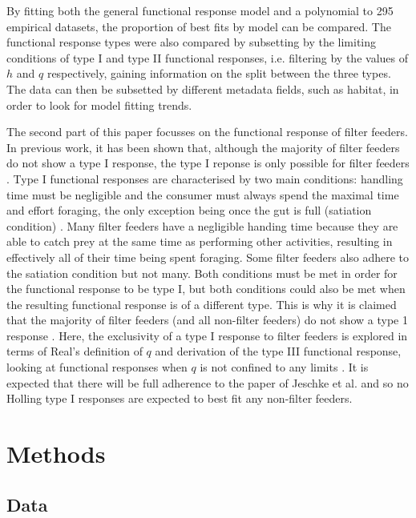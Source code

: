 \documentclass[11pt, a4paper, titlepage]{article}
\begin{document}
By fitting both the general functional response model and a polynomial to 295 empirical datasets, the proportion of best fits by model can be compared. The functional response types were also compared by subsetting by the limiting conditions of type I and type II functional responses, i.e. filtering by the values of $h$ and $q$ respectively, gaining information on the split between the three types. The data can then be subsetted by different metadata fields, such as habitat, in order to look for model fitting trends.

The second part of this paper focusses on the functional response of  filter feeders. In previous work, it has been shown that, although the majority of filter feeders do not show a type I response, the type I reponse is only possible for filter feeders \parencite{Jeschke2004}.  Type I functional responses are characterised by two main conditions: handling time must be negligible and the consumer must always spend the maximal time and effort foraging, the only exception being once the gut is full (satiation condition) \parencite{Jeschke2002}. Many filter feeders have a negligible handing time because they are able to catch prey at the same time as performing other activities, resulting in effectively all of their time being spent foraging. Some filter feeders also adhere to the satiation condition but not many. Both conditions must be met in order for the functional response to be type I, but both conditions could also be met when the resulting functional response is of a different type. This is why it is claimed that the majority of filter feeders (and all non-filter feeders) do not show a type 1 response \parencite{Jeschke2004, Deville2013, Porter1983}. Here, the exclusivity of a type I response to filter feeders is explored in terms of Real's definition of $q$ and derivation of the type III functional response, looking at functional responses when $q$ is not confined to any limits \parencite{Real1977}.  It is expected that there will be full adherence to the paper of Jeschke et al. and so no Holling type I responses are expected to best fit any non-filter feeders.




\section{Methods}

\subsection{Data}
\end{document}
